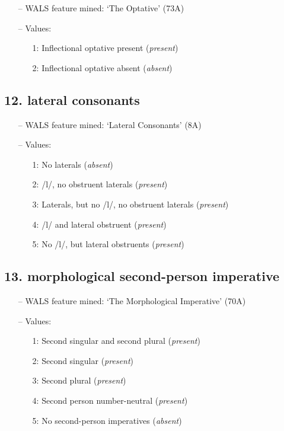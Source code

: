\begin{itemize}
\item[--] WALS feature mined: `The Optative' (73A)
\item[--] Values:

\begin{enumerate}
\item[1:] Inflectional optative present (\emph{present})
\item[2:] Inflectional optative absent (\emph{absent})
\end{enumerate}
\end{itemize}

\subsection*{12. lateral consonants}

\begin{itemize}
\item[--] WALS feature mined: `Lateral Consonants' (8A)
\item[--] Values:

\begin{enumerate}
\item[1:] No laterals (\emph{absent})
\item[2:] /l/, no obstruent laterals (\emph{present})
\item[3:] Laterals, but no /l/, no obstruent laterals (\emph{present})
\item[4:] /l/ and lateral obstruent (\emph{present})
\item[5:] No /l/, but lateral obstruents (\emph{present})
\end{enumerate}
\end{itemize}

\subsection*{13. morphological second-person imperative}

\begin{itemize}
\item[--] WALS feature mined: `The Morphological Imperative' (70A)
\item[--] Values:

\begin{enumerate}
\item[1:] Second singular and second plural (\emph{present})
\item[2:] Second singular (\emph{present})
\item[3:] Second plural (\emph{present})
\item[4:] Second person number-neutral (\emph{present})
\item[5:] No second-person imperatives (\emph{absent})
\end{enumerate}
\end{itemize}

